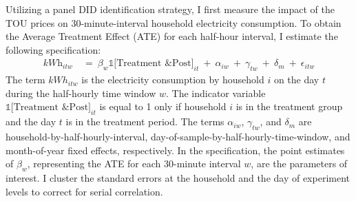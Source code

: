 Utilizing a panel DID identification strategy, I first measure the impact of the TOU prices on 30-minute-interval household electricity consumption. To obtain the Average Treatment Effect (ATE) for each half-hour interval, I estimate the following specification:
\begin{equation}
\begin{split}
    \textit{kWh}_{itw} \ 
    & = \ \beta_{w} \mathbb{1}\big[ \text{Treatment \& Post} \big]_{it} \ + \ \alpha_{iw} \ + \ \gamma_{tw} \ + \ \delta_{m} \ + \ \epsilon_{itw}
\end{split}
\label{Eq:Model-Specification_Half-Hourly-Average-Treatment-Effects}
\end{equation}
The term $kWh_{itw}$ is the electricity consumption by household $i$ on the day $t$ during the half-hourly time window $w$. The indicator variable $\mathbb{1}\big[ \text{Treatment \& Post} \big]_{it}$ is equal to 1 only if household $i$ is in the treatment group and the day $t$ is in the treatment period. The terms $\alpha_{iw}$, $\gamma_{tw}$, and $\delta_{m}$ are household-by-half-hourly-interval, day-of-sample-by-half-hourly-time-window, and month-of-year fixed effects, respectively. In the specification, the point estimates of $\beta_{w}$, representing the ATE for each 30-minute interval $w$, are the parameters of interest. I cluster the standard errors at the household and the day of experiment levels to correct for serial correlation.

